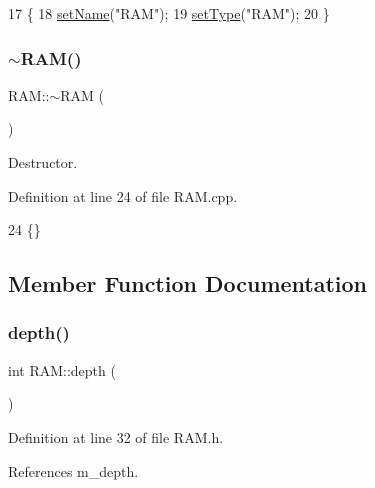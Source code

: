 \begin{DoxyCode}
17           \{
18   \hyperlink{classObject_ae30fea75683c2d149b6b6d17c09ecd0c}{setName}(\textcolor{stringliteral}{"RAM"});
19   \hyperlink{classObject_aae534cc9d982bcb9b99fd505f2e103a5}{setType}(\textcolor{stringliteral}{"RAM"});
20 \}
\end{DoxyCode}
\mbox{\label{classRAM_ac884b3e9ee3c3d95ebcd7b6ed9851da3}} 
\subsubsection{\texorpdfstring{$\sim$\+R\+A\+M()}{~RAM()}}
{\footnotesize\ttfamily R\+A\+M\+::$\sim$\+R\+AM (\begin{DoxyParamCaption}{ }\end{DoxyParamCaption})\hspace{0.3cm}{\ttfamily [virtual]}}



Destructor. 



Definition at line 24 of file R\+A\+M.\+cpp.


\begin{DoxyCode}
24 \{\}
\end{DoxyCode}


\subsection{Member Function Documentation}
\mbox{\label{classRAM_aa36cbedb8a970a01ee07a9637553887f}} 
\subsubsection{\texorpdfstring{depth()}{depth()}}
{\footnotesize\ttfamily int R\+A\+M\+::depth (\begin{DoxyParamCaption}{ }\end{DoxyParamCaption})\hspace{0.3cm}{\ttfamily [inline]}}



Definition at line 32 of file R\+A\+M.\+h.



References m\+\_\+depth.



